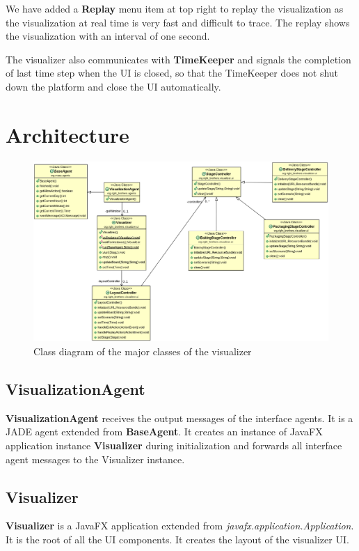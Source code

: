 \documentclass[12pt]{article}
\begin{document}
We have added a \textbf{Replay} menu item at top right to replay the visualization as the visualization at real time is very fast and difficult to trace. The replay shows the visualization with an interval of one second.

The visualizer also communicates with \textbf{TimeKeeper} and signals the completion of last time step when the UI is closed, so that the TimeKeeper does not shut down the platform and close the UI automatically.

\newpage

\section{Architecture}%
\label{sec:architecture}

\begin{figure}[htpb]
    \centering
    \includegraphics[width=1.0\linewidth]{class-diagram.png}
    \caption{Class diagram of the major classes of the visualizer}
\end{figure}


\subsection{VisualizationAgent}
\textbf{VisualizationAgent} receives the output messages of the interface agents. It is a JADE agent extended from \textbf{BaseAgent}. It creates an instance of JavaFX application instance \textbf{Visualizer} during initialization and forwards all interface agent messages to the Visualizer instance.

\subsection{Visualizer}
\textbf{Visualizer} is a JavaFX application extended from \textit{javafx.application.Application}. It is the root of all the UI components. It creates the layout of the visualizer UI.
\end{document}
